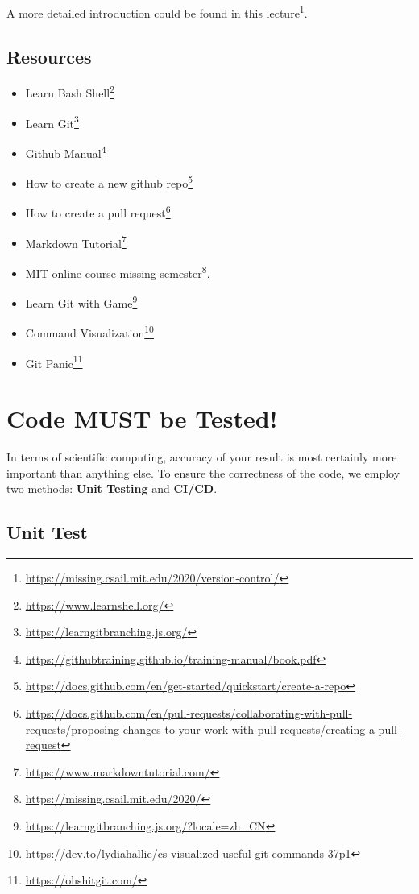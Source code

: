 \documentclass[
  notoc %
]{tufte-book}
\DeclareRobustCommand{\href}[2]{#2\footnote{\url{#1}}}
\providecommand{\tightlist}{%
  \setlength{\itemsep}{0pt}\setlength{\parskip}{0pt}
}
\begin{document}
A more detailed introduction could be found in this
\href{https://missing.csail.mit.edu/2020/version-control/}{lecture}.

\hypertarget{resources}{%
\subsection{Resources}\label{resources}}

\begin{itemize}
\tightlist
\item
  \href{https://www.learnshell.org/}{Learn Bash Shell}
\item
  \href{https://learngitbranching.js.org/}{Learn Git}
\item
  \href{https://githubtraining.github.io/training-manual/book.pdf}{Github
  Manual}
\item
  \href{https://docs.github.com/en/get-started/quickstart/create-a-repo}{How
  to create a new github repo}
\item
  \href{https://docs.github.com/en/pull-requests/collaborating-with-pull-requests/proposing-changes-to-your-work-with-pull-requests/creating-a-pull-request}{How
  to create a pull request}
\item
  \href{https://www.markdowntutorial.com/}{Markdown Tutorial}
\item
  MIT online course \href{https://missing.csail.mit.edu/2020/}{missing
  semester}.
\item
  \href{https://learngitbranching.js.org/?locale=zh_CN}{Learn Git with
  Game}
\item
  \href{https://dev.to/lydiahallie/cs-visualized-useful-git-commands-37p1}{Command
  Visualization}
\item
  \href{https://ohshitgit.com/}{Git Panic}
\end{itemize}

\hypertarget{sec:ci-cd}{%
\section{Code MUST be Tested!}\label{sec:ci-cd}}

In terms of scientific computing, accuracy of your result is most
certainly more important than anything else. To ensure the correctness
of the code, we employ two methods: \textbf{Unit Testing} and
\textbf{CI/CD}.

\hypertarget{unit-test}{%
\subsection{Unit Test}\label{unit-test}}
\end{document}

